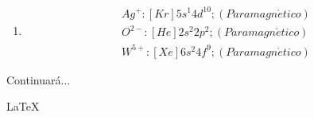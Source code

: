 \documentclass{article}
\begin{document}
\begin{enumerate}
\begin{enumerate}
        \item
        \begin{equation*}
            \begin{split}
                Ag^{+}: [Kr]5s^{1}4d^{10} ; (Paramagn\acute{e}tico)\\
                O^{2-}: [He]2s^{2}2p^{2} ; (Paramagn\acute{e}tico)\\
                W^{5+}: [Xe]6s^{2}4f^{9} ; (Paramagn\acute{e}tico)
            \end{split}
        \end{equation*}
    \end{enumerate}



\end{enumerate}

Continuar\'a$\ldots $

\LaTeX
\end{document}
